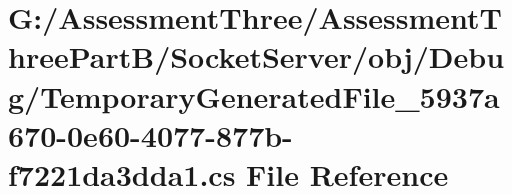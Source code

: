 \hypertarget{_socket_server_2obj_2_debug_2_temporary_generated_file__5937a670-0e60-4077-877b-f7221da3dda1_8cs}{}\section{G\+:/\+Assessment\+Three/\+Assessment\+Three\+Part\+B/\+Socket\+Server/obj/\+Debug/\+Temporary\+Generated\+File\+\_\+5937a670-\/0e60-\/4077-\/877b-\/f7221da3dda1.cs File Reference}
\label{_socket_server_2obj_2_debug_2_temporary_generated_file__5937a670-0e60-4077-877b-f7221da3dda1_8cs}
